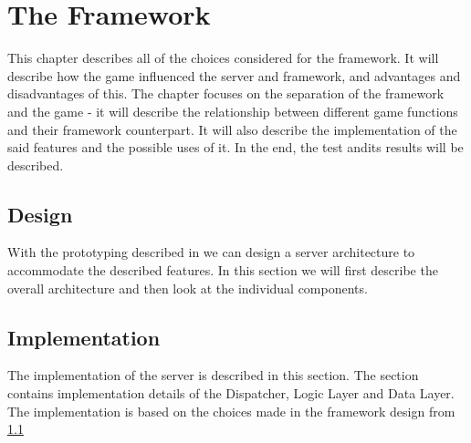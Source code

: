 \chapter{The Framework}

This chapter describes all of the choices considered for the framework. It will describe how the game influenced the server and framework, and advantages and disadvantages of this. The chapter focuses on the separation of the framework and the game - it will describe the relationship between different game functions and their framework counterpart. It will also describe the implementation of the said features and the possible uses of it. In the end, the test andits results will be described.

\section{Design}\label{sec:desFram}
With the prototyping described in  we can design a server architecture to accommodate the described features. In this section we will first describe the overall architecture and then look at the individual components.

\section{Implementation}
The implementation of the server is described in this section. The section contains implementation details of the Dispatcher, Logic Layer and Data Layer.\\

The implementation is based on the choices made in the framework design from \cref{sec:desFram}


